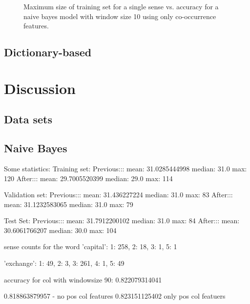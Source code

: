 \documentclass{article}
\begin{document}
\begin{figure}[h]\label{fig:size}
\centering
{}
\caption{Maximum size of training set for a single sense vs. accuracy for a naive bayes model with window size 10 using only co-occurrence features.}
\end{figure}

\subsection{Dictionary-based}

\section{Discussion}

\subsection*{Data sets}

\subsection*{Naive Bayes}

Some statistics: 
Training set:
Previous::: mean: 31.0285444998 median: 31.0 max: 120
After::: mean: 29.7005520399 median: 29.0 max: 114

Validation set:
Previous::: mean: 31.436227224 median: 31.0 max: 83
After::: mean: 31.1232583065 median: 31.0 max: 79

Test Set:
Previous::: mean: 31.7912200102 median: 31.0 max: 84
After::: mean: 30.6061766207 median: 30.0 max: 104

sense counts for the word 'capital':
{1: 258, 2: 18, 3: 1, 5: 1}

'exchange':
{1: 49, 2: 3, 3: 261, 4: 1, 5: 49}

accuracy for col with windowsize 90: 0.822079314041 

0.818863879957 - no pos col features
0.823151125402 only pos col featuers
\end{document}

